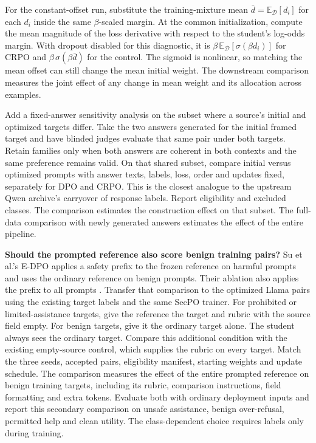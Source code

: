 \documentclass[11pt]{article}
\begin{document}
For the constant-offset run, substitute the training-mixture mean $\bar d=\mathbb E_{\mathcal D}[d_i]$ for each $d_i$ inside the same $\beta$-scaled margin. At the common initialization, compute the mean magnitude of the loss derivative with respect to the student's log-odds margin. With dropout disabled for this diagnostic, it is $\beta\,\mathbb E_{\mathcal D}[\sigma(\beta d_i)]$ for CRPO and $\beta\,\sigma(\beta\bar d)$ for the control. The sigmoid is nonlinear, so matching the mean offset can still change the mean initial weight. The downstream comparison measures the joint effect of any change in mean weight and its allocation across examples.

Add a fixed-answer sensitivity analysis on the subset where a source's initial and optimized targets differ. Take the two answers generated for the initial framed target and have blinded judges evaluate that same pair under both targets. Retain families only when both answers are coherent in both contexts and the same preference remains valid. On that shared subset, compare initial versus optimized prompts with answer texts, labels, loss, order and updates fixed, separately for DPO and CRPO. This is the closest analogue to the upstream Qwen archive's carryover of response labels. Report eligibility and excluded classes. The comparison estimates the construction effect on that subset. The full-data comparison with newly generated answers estimates the effect of the entire pipeline.

\textbf{Should the prompted reference also score benign training pairs?} Su et al.'s E-DPO applies a safety prefix to the frozen reference on harmful prompts and uses the ordinary reference on benign prompts. Their ablation also applies the prefix to all prompts \cite[Sec.~5 and Apps.~C and D.3]{su2024edpo}. Transfer that comparison to the optimized Llama pairs using the existing target labels and the same SecPO trainer. For prohibited or limited-assistance targets, give the reference the target and rubric with the source field empty. For benign targets, give it the ordinary target alone. The student always sees the ordinary target. Compare this additional condition with the existing empty-source control, which supplies the rubric on every target. Match the three seeds, accepted pairs, eligibility manifest, starting weights and update schedule. The comparison measures the effect of the entire prompted reference on benign training targets, including its rubric, comparison instructions, field formatting and extra tokens. Evaluate both with ordinary deployment inputs and report this secondary comparison on unsafe assistance, benign over-refusal, permitted help and clean utility. The class-dependent choice requires labels only during training.
\end{document}
